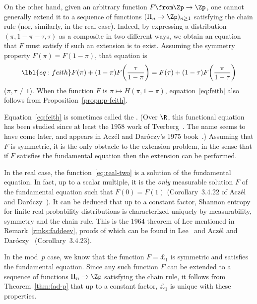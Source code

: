 On the other hand, given an arbitrary function $F \from \Zp \to \Zp$, one
cannot generally extend it to a sequence of functions $(\Pi_n \to \Zp)_{n
  \geq 1}$ satisfying the chain rule (nor, similarly, in the real case).
Indeed, by expressing a distribution $(\pi, 1 - \pi - \tau, \tau)$ as a
composite in two different ways, we obtain an equation that $F$ must
satisfy if such an extension is to exist.  Assuming the symmetry property
$F(\pi) = F(1 - \pi)$, that equation is
% 
\begin{equation}
\lbl{eq:feith}
F(\pi) + (1 - \pi) F\biggl(\frac{\tau}{1 - \pi}\biggr)
=
F(\tau) + (1 - \tau) F\biggl(\frac{\pi}{1 - \tau}\biggr)
\end{equation}
% 
($\pi, \tau \neq 1$).  When the function $F$ is $\pi \mapsto H(\pi, 1 -
\pi)$, equation~\eqref{eq:feith} also follows from
Proposition~\ref{propn:p-feith}.

Equation~\eqref{eq:feith} is sometimes called the .  (Over $\R$, this functional equation has
been studied since at least the 1958 work of Tverberg~\cite{Tver}. The name
seems to have come later, and appears in Acz\'el and Dar\'oczy's 1975
book~\cite{AcDa}.)  Assuming that $F$ is symmetric, it is the only obstacle
to the extension problem, in the sense that if $F$ satisfies the
fundamental equation then the extension can be performed.

In the real case, the function~\eqref{eq:real-two} is a solution of the
fundamental equation.  In fact, up to a scalar multiple, it is the
\emph{only} measurable solution $F$ of the fundamental equation such that
$F(0) = F(1)$ (Corollary~3.4.22 of Acz\'el and Dar\'oczy~\cite{AcDa}).  It
can be deduced that up to a constant factor, Shannon entropy for finite
real probability distributions is characterized uniquely by measurability,
symmetry and the chain rule.  This is the 1964 theorem of Lee%
%
%
mentioned in Remark~\ref{rmks:faddeev},
proofs of which can be found in Lee~\cite{Lee} and Acz\'el and
Dar\'oczy~\cite{AcDa} (Corollary~3.4.23).

In the mod~$p$ case, we know that the function $F = \pounds_1$ is symmetric
and satisfies the fundamental equation.  Since any such function $F$ can be
extended to a sequence of functions $\Pi_n \to \Zp$ satisfying the chain
rule, it follows from Theorem~\ref{thm:fad-p} that up to a constant factor,
$\pounds_1$ is unique with these properties.

